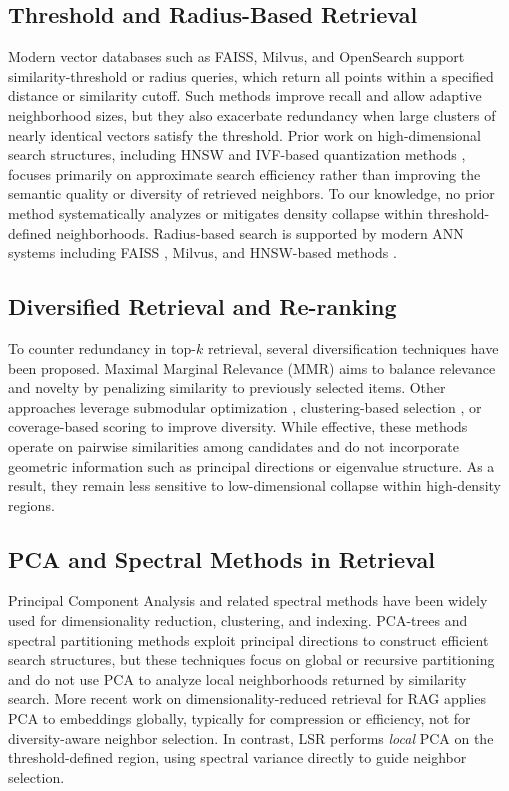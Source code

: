 \documentclass{article}
\begin{document}
\subsection{Threshold and Radius-Based Retrieval}
Modern vector databases such as FAISS\cite{johnson2019billion}, Milvus, and OpenSearch support similarity-threshold or radius queries, which return all points within a specified distance or similarity cutoff. Such methods improve recall and allow adaptive neighborhood sizes, but they also exacerbate redundancy when large clusters of nearly identical vectors satisfy the threshold. Prior work on high-dimensional search structures, including HNSW \cite{malkov2018efficient} and IVF-based quantization methods \cite{jegou2011product}, focuses primarily on approximate search efficiency rather than improving the semantic quality or diversity of retrieved neighbors. To our knowledge, no prior method systematically analyzes or mitigates density collapse within threshold-defined neighborhoods.
Radius-based search is supported by modern ANN systems including FAISS \cite{johnson2019billion}, Milvus, and HNSW-based methods \cite{malkov2018efficient}.

\subsection{Diversified Retrieval and Re-ranking}
To counter redundancy in top-$k$ retrieval, several diversification techniques have been proposed. Maximal Marginal Relevance (MMR) \cite{carbonell1998mmr} aims to balance relevance and novelty by penalizing similarity to previously selected items. Other approaches leverage submodular optimization \cite{lin2012learning}, clustering-based selection \cite{xia2022dense}, or coverage-based scoring to improve diversity. While effective, these methods operate on pairwise similarities among candidates and do not incorporate geometric information such as principal directions or eigenvalue structure. As a result, they remain less sensitive to low-dimensional collapse within high-density regions.

\subsection{PCA and Spectral Methods in Retrieval}
Principal Component Analysis and related spectral methods have been widely used for dimensionality reduction, clustering, and indexing. PCA-trees \cite{sproull1991pca} and spectral partitioning methods exploit principal directions to construct efficient search structures, but these techniques focus on global or recursive partitioning and do not use PCA to analyze local neighborhoods returned by similarity search. More recent work on dimensionality-reduced retrieval for RAG \cite{park2024pca} applies PCA to embeddings globally, typically for compression or efficiency, not for diversity-aware neighbor selection. In contrast, LSR performs \emph{local} PCA on the threshold-defined region, using spectral variance directly to guide neighbor selection.
\end{document}
